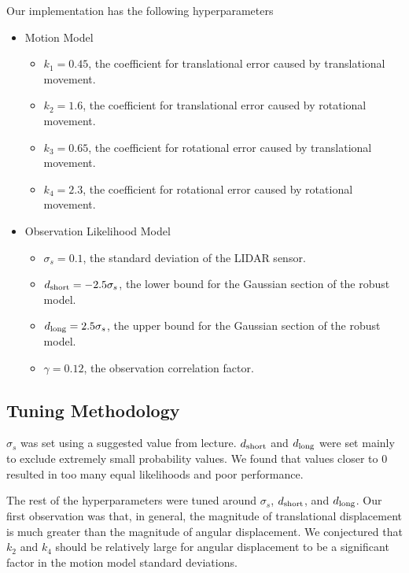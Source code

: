 \documentclass[11pt]{article}
\begin{document}
Our implementation has the following hyperparameters

\begin{itemize}
    \setlength\itemsep{0pt}
    \item Motion Model
    \begin{itemize}
        \setlength\itemsep{0pt}
        \item $k_1 = 0.45$, the coefficient for translational error caused by translational movement.
        \item $k_2 = 1.6$, the coefficient for translational error caused by rotational movement.
        \item $k_3 = 0.65$, the coefficient for rotational error caused by translational movement.
        \item $k_4 = 2.3$, the coefficient for rotational error caused by rotational movement.
    \end{itemize}

    \item Observation Likelihood Model
    \begin{itemize}
        \setlength\itemsep{0pt}
        \item $\sigma_s = 0.1$, the standard deviation of the LIDAR sensor.
        \item $d_{\textrm{short}} = -2.5 \sigma_s$, the lower bound for the Gaussian section of the robust model.
        \item $d_{\textrm{long}} = 2.5 \sigma_s$, the upper bound for the Gaussian section of the robust model.
        \item $\gamma = 0.12$, the observation correlation factor.
    \end{itemize}
\end{itemize}

\subsection{Tuning Methodology}

$\sigma_s$ was set using a suggested value from lecture. $d_{\textrm{short}}$ and $d_{\textrm{long}}$
were set mainly to exclude extremely small probability values. We found that
values closer to 0 resulted in too many equal likelihoods and poor performance.

The rest of the hyperparameters were tuned around $\sigma_s$, $d_{\textrm{short}}$, and
$d_{\textrm{long}}$. Our first observation was that, in general, the magnitude of
translational displacement is much greater than the magnitude of angular
displacement. We conjectured that $k_2$ and $k_4$ should be relatively large
for angular displacement to be a significant factor in the motion model standard
deviations.
\end{document}
